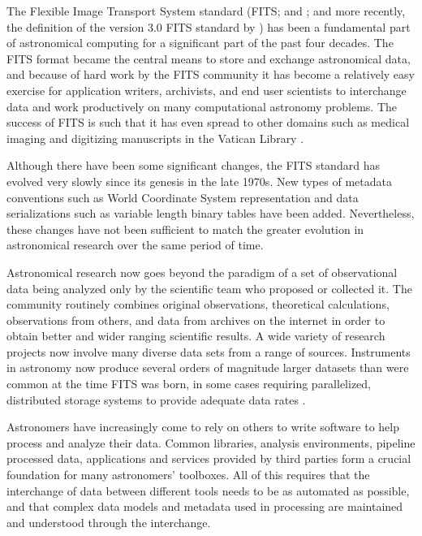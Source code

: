 \documentclass[final,authoryear,5p,times,twocolumn]{elsarticle}
\begin{document}
The Flexible Image Transport System standard (FITS;
\citealt{1979ipia.coll..445W,1980SPIE..264..298G,1981A&AS...44..363W,1981A&AS...44..371G} and
\citealt{2001A&A...376..359H}; and more recently, the definition of the
version 3.0 FITS standard by \citealt{2010A&A...524A..42P}) has been a
fundamental part of astronomical computing for a significant part of the
past four decades. The FITS format became the central means to store and
exchange astronomical data, and because of hard work by the FITS
community it has become a relatively easy exercise for application
writers, archivists, and end user scientists to interchange data and
work productively on many computational astronomy problems. The success
of FITS is such that it has even spread to other domains such as medical
imaging and digitizing manuscripts in the Vatican Library
\citep{2006JRASC.100..242W,2012EWASSAlle}.


Although there have been some significant changes, the FITS standard
has evolved very slowly since its genesis in the late 1970s. New types
of metadata conventions such as World Coordinate System
\citep[WCS;][]{2002A&A...395.1061G,2002A&A...395.1077C,2006A&A...446..747G}
representation and data serializations such as variable length binary
tables \citep{1995A&AS..113..159C} have been added. Nevertheless,
these changes have not been sufficient to match the greater evolution
in astronomical research over the same period of time.


Astronomical research now goes beyond the paradigm of a set of
observational data being analyzed only by the scientific team who
proposed or collected it. The community routinely combines original
observations, theoretical calculations, observations from others, and
data from archives on the internet in order to obtain better and wider
ranging scientific results. A wide variety of research projects now involve many
diverse data sets from a range of sources. Instruments in astronomy
now produce several orders of magnitude larger datasets than were common
at the time FITS was born, in some cases requiring parallelized,
distributed storage systems to provide adequate data rates
\citep{2012ASPC..461..283A}.


Astronomers have increasingly come to rely on others to write software
to help process and analyze their data. Common libraries, analysis
environments, pipeline processed data, applications and services
provided by third parties form a crucial foundation for many
astronomers' toolboxes. All of this requires that the interchange of
data between different tools needs to be as automated as possible, and
that complex data models and metadata used in processing are
maintained and understood through the interchange.
\end{document}
